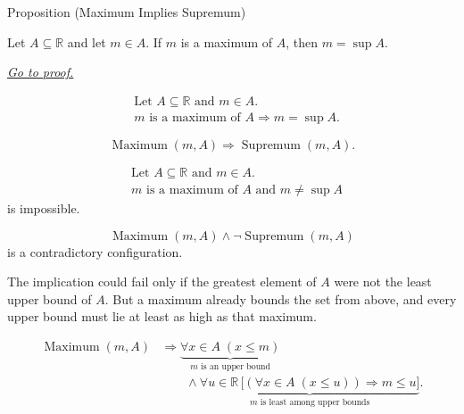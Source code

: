 \begin{propositionbox}{Proposition (Maximum Implies Supremum)}
\begin{proposition}
\label{prop:maximum-implies-supremum}
Let $A\subseteq\mathbb{R}$ and let $m\in A$. If $m$ is a maximum of $A$, then $m=\sup A$.

\smallskip
\noindent
\hyperref[prf:maximum-implies-supremum]{\textit{Go to proof.}}
\end{proposition}
\end{propositionbox}

\begin{remark*}
\[
\begin{aligned}
&\text{Let }A\subseteq\mathbb{R}\text{ and }m\in A.\\
&m\text{ is a maximum of }A
\Longrightarrow
m=\sup A.
\end{aligned}
\]
\end{remark*}

\begin{remark*}
\[
\operatorname{Maximum}(m,A)
\Longrightarrow
\operatorname{Supremum}(m,A).
\]
\end{remark*}

\begin{remark*}
\[
\begin{aligned}
&\text{Let }A\subseteq\mathbb{R}\text{ and }m\in A.\\
&m\text{ is a maximum of }A
\text{ and }m\ne\sup A
\end{aligned}
\]
is impossible.
\end{remark*}

\begin{remark*}
\[
\operatorname{Maximum}(m,A)\land \neg\operatorname{Supremum}(m,A)
\]
is a contradictory configuration.
\end{remark*}

\begin{remark*}
The implication could fail only if the greatest element of $A$ were not the least upper bound of $A$. But a maximum already bounds the set from above, and every upper bound must lie at least as high as that maximum.
\end{remark*}

\begin{remark*}
\[
\begin{aligned}
\operatorname{Maximum}(m,A)
&\Longrightarrow
\underbrace{\forall x\in A\;(x\le m)}_{m\text{ is an upper bound}}\\
&\qquad\land
\underbrace{\forall u\in\mathbb{R}\,
\bigl[(\forall x\in A\;(x\le u))\Longrightarrow m\le u\bigr]}_{m\text{ is least among upper bounds}}.
\end{aligned}
\]
\end{remark*}

